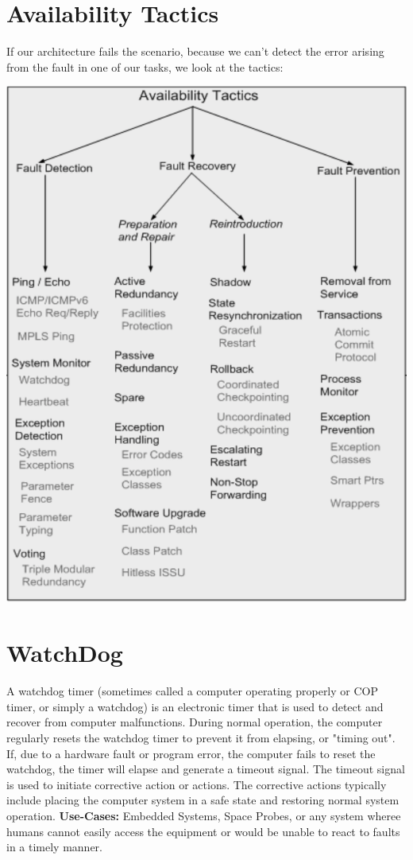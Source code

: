\documentclass{report}
\begin{document}
\pagebreak
\section{Availability Tactics}

If our architecture fails the scenario, because we can't detect the error arising from the fault in one of our tasks, we look at the tactics:
\begin{center}
\includegraphics[scale=0.6]{abcdefg.png}
\end{center}

\section{WatchDog}

A watchdog timer (sometimes called a computer operating properly or COP timer, or simply a watchdog) is an electronic timer that is used to detect and recover from computer malfunctions. During normal operation, the computer regularly resets the watchdog timer to prevent it from elapsing, or "timing out". If, due to a hardware fault or program error, the computer fails to reset the watchdog, the timer will elapse and generate a timeout signal. The timeout signal is used to initiate corrective action or actions. The corrective actions typically include placing the computer system in a safe state and restoring normal system operation.\newline
\textbf{Use-Cases: } Embedded Systems, Space Probes, or any system wheree humans cannot easily access the equipment or would be unable to react to faults in a timely manner.
\end{document}
